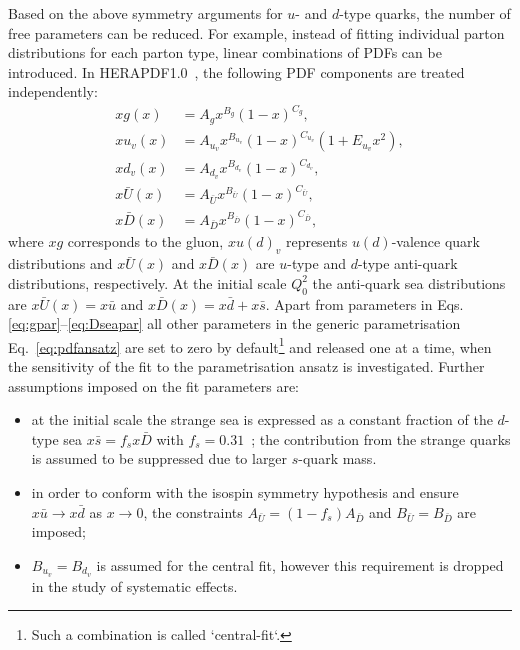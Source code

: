Based on the above symmetry arguments for $u$- and $d$-type quarks, the number of free parameters can be reduced. For example, instead of fitting individual parton distributions for each parton type, linear combinations of PDFs can be introduced.  In HERAPDF1.0~\cite{Aaron:2009aa}, the following PDF components are treated independently:
\begin{align}
 xg\left(x\right) &= A_gx^{B_g}\left(1-x\right)^{C_g}, \label{eq:gpar} \\
 xu_v\left(x\right) &= A_{u_v}x^{B_{u_v}}\left(1-x\right)^{C_{u_v}}\left(1+E_{u_v}x^2\right),\\
 xd_v\left(x\right) &= A_{d_v}x^{B_{d_v}}\left(1-x\right)^{C_{d_v}},\\
 x\bar{U}\left(x\right) &= A_{\bar{U}}x^{B_{\bar{U}}}\left(1-x\right)^{C_{\bar{U}}},\\
 x\bar{D}\left(x\right) &= A_{\bar{D}}x^{B_{\bar{D}}}\left(1-x\right)^{C_{\bar{D}}}, \label{eq:Dseapar}
\end{align}
where $xg$ corresponds to the gluon, $xu\left(d\right)_v$ represents $u\left(d\right)$-valence quark distributions and $x\bar{U}\left(x\right)$ and $x\bar{D}\left(x\right)$ are $u$-type and $d$-type anti-quark distributions, respectively. At the initial scale $Q^2_0$ the anti-quark sea distributions are $x\bar{U}\left(x\right)=x\bar u$ and $x\bar{D}\left(x\right)=x\bar d+x\bar s$. Apart from parameters in Eqs.\eqref{eq:gpar}--\eqref{eq:Dseapar} all other parameters in the generic parametrisation Eq.~\eqref{eq:pdfansatz} are set to zero by default\footnote{Such a combination is called `central-fit`.} and released one at a time, when the sensitivity of the fit to the parametrisation ansatz is investigated. Further assumptions imposed on the fit parameters are:
\begin{itemize}
 \item at the initial scale the strange sea is expressed as a constant fraction of the $d$-type sea $x\bar s=f_s x \bar D$ with $f_s=0.31$~\cite{Martin:2009iq,Nadolsky:2008zw}; the contribution from the strange quarks is assumed to be suppressed due to larger $s$-quark mass.
 \item in order to conform with the isospin symmetry hypothesis and ensure $x\bar u \rightarrow x\bar d$ as $x\rightarrow 0$, the constraints $A_{\bar U}=\left(1-f_s\right)A_{\bar D}$ and $B_{\bar{U}}=B_{\bar{D}}$ are imposed;
 \item $B_{u_v}=B_{d_v}$ is assumed for the central fit, however this requirement is dropped in the study of systematic effects.
\end{itemize}
